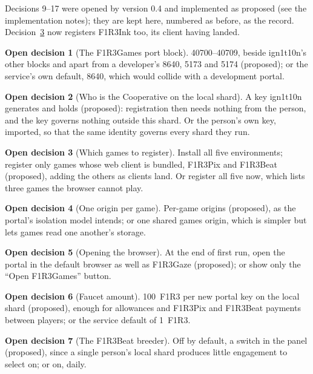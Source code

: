 \documentclass[11pt]{article}
\theoremstyle{definition}
\newtheorem{decision}{Open decision}
\theoremstyle{remark}
\newcommand{\Gz}{F1R3Gaze}
\newcommand{\Hr}{ign1t10n}
\newcommand{\Gm}{F1R3Games}
\begin{document}
Decisions 9--17 were opened by version 0.4 and implemented as proposed (see the
implementation notes); they are kept here, numbered as before, as the record.
Decision~\ref{dec:which} now registers F1R3Ink too, its client having landed.

\setcounter{decision}{8}
\begin{decision}[The \Gm{} port block]\label{dec:ports}
40700--40709, beside \Hr{}'s other blocks and apart from a developer's 8640, 5173 and
5174 (proposed); or the service's own default, 8640, which would collide with a
development portal.
\end{decision}

\begin{decision}[Who is the Cooperative on the local shard]\label{dec:coop}
A key \Hr{} generates and holds (proposed): registration then needs nothing from the
person, and the key governs nothing outside this shard. Or the person's own key,
imported, so that the same identity governs every shard they run.
\end{decision}

\begin{decision}[Which games to register]\label{dec:which}
Install all five environments; register only games whose web client is bundled,
F1R3Pix and F1R3Beat (proposed), adding the others as clients land. Or register all
five now, which lists three games the browser cannot play.
\end{decision}

\begin{decision}[One origin per game]\label{dec:pergame}
Per-game origins (proposed), as the portal's isolation model intends; or one shared
games origin, which is simpler but lets games read one another's storage.
\end{decision}

\begin{decision}[Opening the browser]\label{dec:open}
At the end of first run, open the portal in the default browser as well as \Gz{}
(proposed); or show only the ``Open \Gm{}'' button.
\end{decision}

\begin{decision}[Faucet amount]\label{dec:faucet}
100~F1R3 per new portal key on the local shard (proposed), enough for allowances and
F1R3Pix and F1R3Beat payments between players; or the service default of 1~F1R3.
\end{decision}

\begin{decision}[The F1R3Beat breeder]\label{dec:breeder}
Off by default, a switch in the panel (proposed), since a single person's local shard
produces little engagement to select on; or on, daily.
\end{decision}
\end{document}
